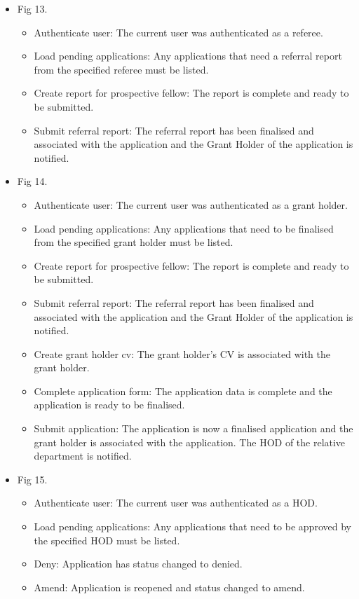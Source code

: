 \documentclass[12pt]{article}
\begin{document}
\begin{itemize}
	\item Fig 13.
		\begin{itemize}
			\item Authenticate user: The current user was authenticated as a referee.
			\item Load pending applications: Any applications that need a referral report from the specified referee must be listed.
			\item Create report for prospective fellow: The report is complete and ready to be submitted.				
			\item Submit referral report: The referral report has been finalised and associated with the application and the Grant Holder of the application is notified.									
		\end{itemize}
	\item Fig 14.
		\begin{itemize}
			\item Authenticate user: The current user was authenticated as a grant holder.
			\item Load pending applications: Any applications that need to be finalised from the specified grant holder must be listed.
			\item Create report for prospective fellow: The report is complete and ready to be submitted.				
			\item Submit referral report: The referral report has been finalised and associated with the application and the Grant Holder of the application is notified.
			\item Create grant holder cv: The grant holder's CV is associated with the grant holder.
			\item Complete application form: The application data is complete and the application is ready to be finalised.
			\item Submit application: The application is now a finalised application and the grant holder is associated with the application. The HOD of the relative department is notified. 									
		\end{itemize}	
	\item Fig 15.
		\begin{itemize}
			\item Authenticate user: The current user was authenticated as a HOD.
			\item Load pending applications: Any applications that need to be approved by the specified HOD must be listed.
			\item Deny: Application has status changed to denied.
			\item Amend: Application is reopened and status changed to amend.

\end{itemize}
\end{itemize}
\end{document}
